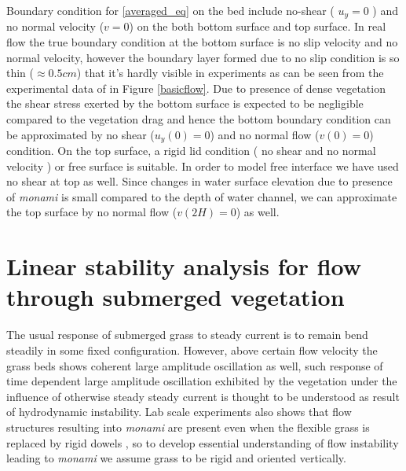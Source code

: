 \documentclass[12pt]{report}   %
\newcommand{\monami}{\textit{monami}}
\begin{document}
Boundary condition for \eqref{averaged_eq} on the bed include no-shear ( $u_y=0$ ) and no normal velocity ($v=0$) on the both bottom surface and top surface.
In real flow the true boundary condition at the bottom surface is no slip velocity and no normal velocity, however the boundary layer formed due to no slip condition is so thin ($\approx 0.5 cm$) that it's hardly visible in experiments as can be seen from the experimental data of \cite{Nepf04} in Figure \ref{basicflow}. Due to presence of dense vegetation the shear stress exerted by the bottom surface is expected to be negligible compared to the vegetation drag \cite{Nepf04} and hence the bottom boundary condition can be approximated by no shear ($u_y(0)=0$) and no normal flow ($v(0)=0$) condition.
On the top surface, a rigid lid condition ( no shear and no normal velocity ) or free surface is suitable. In order to model free interface we have used no shear at top as well. Since changes in water surface elevation due to presence of {\monami}  is small compared to the depth of water channel, we can approximate the top surface by no normal flow ($v(2H)=0$) as well.  %
%
\clearpage{\pagestyle{empty}\cleardoublepage}
\chapter{Linear stability analysis for flow through submerged vegetation}
The usual response of submerged grass to steady current is to remain bend steadily in some fixed configuration. However, above certain flow velocity the grass beds shows coherent large amplitude oscillation as well, such response of time dependent large amplitude oscillation exhibited by the vegetation under the influence of otherwise steady steady current is thought to be understood as result of hydrodynamic instability. Lab scale experiments also shows that flow structures resulting into {\monami} are present even when the flexible grass is replaced by rigid dowels \cite{Ghisal02,Nepf04}, so to develop essential understanding of flow instability leading to {\monami} we assume grass to be rigid and oriented vertically. 
\end{document}
